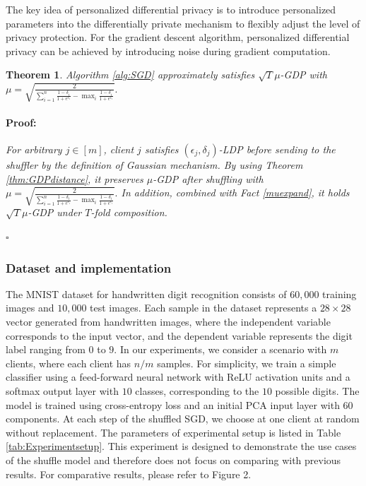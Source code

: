 \documentclass[letterpaper]{article} %
\newtheorem{theorem}{Theorem}
\newenvironment{proof}{\paragraph{Proof:}}{\hfill$\square$}
\begin{document}
The key idea of personalized differential privacy is to introduce personalized parameters into the differentially private mechanism to flexibly adjust the level of privacy protection. For the gradient descent algorithm, personalized differential privacy can be achieved by introducing noise during gradient computation.

\begin{theorem}\label{ProSGD1}
Algorithm \ref{alg:SGD} approximately satisfies $\sqrt{T}\mu$-GDP with $
\mu = \sqrt{\frac{2}{\sum_{i=1}^{n} \frac{1-\delta_i}{1+e^{\epsilon_i}}-\max_{i}{\frac{1-\delta_{i}}{1+e^{\epsilon_{i}}}}}}.
$
\begin{proof}
For arbitrary $j \in [m]$, client $j$ satisfies $(\epsilon_j,\delta_j)$-LDP before sending to the shuffler by the definition of Gaussian mechanism. By using Theorem \ref{thm:GDPdistance}, it preserves $\mu$-GDP after shuffling with $
\mu = \sqrt{\frac{2}{\sum_{i=1}^{n} \frac{1-\delta_i}{1+e^{\epsilon_i}}-\max_{i}{\frac{1-\delta_{i}}{1+e^{\epsilon_{i}}}}}}.
$ In addition, combined with Fact \ref{muexpand}, it holds $\sqrt{T}\mu$-GDP under $T$-fold composition.

\end{proof}
\end{theorem}
\subsubsection*{Dataset and implementation}
The MNIST dataset \cite{lecun1998gradient} for handwritten digit recognition consists of $60,000$ training images and $10,000$ test images. Each sample in the dataset represents a $28 \times 28$ vector generated from handwritten images, where the independent variable corresponds to the input vector, and the dependent variable represents the digit label ranging from $0$ to $9$.
In our experiments, we consider a scenario with $m$ clients, where each client has $n/m$ samples. For simplicity, we train a simple classifier using a feed-forward neural network with ReLU activation units and a softmax output layer with $10$ classes, corresponding to the $10$ possible digits. The model is trained using cross-entropy loss and an initial PCA input layer with $60$ components. At each step of the shuffled SGD, we choose at one client at random without replacement. The parameters of experimental setup is listed in Table \ref{tab:Experimentsetup}.
This experiment is designed to demonstrate the use cases of the shuffle model and therefore does not focus on comparing with previous results. For comparative results, please refer to Figure 2.
\end{document}
